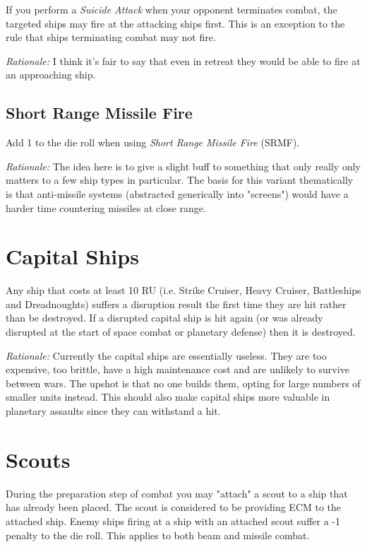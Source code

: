 \documentclass[a4paper,11pt]{article}
\begin{document}
If you perform a \textit{Suicide Attack} when your opponent terminates combat, the targeted ships may fire at the attacking ships first. This is an exception to the rule that ships terminating combat may not fire.

\textit{Rationale:} I think it's fair to say that even in retreat they would be able to fire at an approaching ship.

\subsection{Short Range Missile Fire}

Add 1 to the die roll when using \textit{Short Range Missile Fire} (SRMF).

\textit{Rationale:} The idea here is to give a slight buff to something that only really only matters to a few ship types in particular. The basis for this variant thematically is that anti-missile systems (abstracted generically into "screens") would have a harder time countering missiles at close range.

\section{Capital Ships}

Any ship that costs at least 10 RU (i.e. Strike Cruiser, Heavy Cruiser, Battleships and Dreadnoughts) suffers a disruption result the first time they are hit rather than be destroyed. If a disrupted capital ship is hit again (or was already disrupted at the start of space combat or planetary defense) then it is destroyed.

\textit{Rationale:} Currently the capital ships are essentially useless. They are too expensive, too brittle, have a high maintenance cost and are unlikely to survive between wars. The upshot is that no one builds them, opting for large numbers of smaller units instead. This should also make capital ships more valuable in planetary assaults since they can withstand a hit.

\section{Scouts}

During the preparation step of combat you may "attach" a scout to a ship that has already been placed. The scout is considered to be providing ECM to the attached ship. Enemy ships firing at a ship with an attached scout suffer a -1 penalty to the die roll. This applies to both beam and missile combat.
\end{document}
